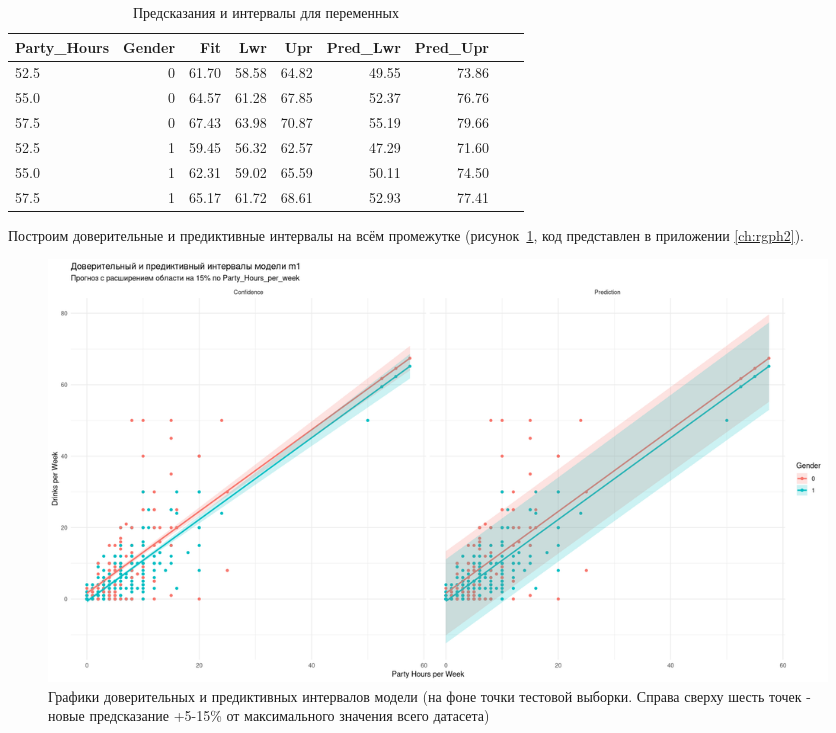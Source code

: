 

\begin{table}[ht]
	\centering
	\caption{Предсказания и интервалы для переменных}
	\begin{tabular}{|l|r|r|r|r|r|r|r|r|}
		\hline
		Party\_Hours & Gender & Fit & Lwr & Upr & Pred\_Lwr & Pred\_Upr \\
		\hline
		52.5 & 0 & 61.70 & 58.58 & 64.82 & 49.55 & 73.86 \\
		55.0 & 0 & 64.57 & 61.28 & 67.85 & 52.37 & 76.76 \\
		57.5 & 0 & 67.43 & 63.98 & 70.87 & 55.19 & 79.66 \\
		52.5 & 1 & 59.45 & 56.32 & 62.57 & 47.29 & 71.60 \\
		55.0 & 1 & 62.31 & 59.02 & 65.59 & 50.11 & 74.50 \\
		57.5 & 1 & 65.17 & 61.72 & 68.61 & 52.93 & 77.41 \\
		\hline
	\end{tabular}
	\label{tab:pred_intervals}
\end{table}

Построим доверительные и предиктивные интервалы\cite{wapnick2009} на всём промежутке (рисунок~\ref{fig:intervals}, код представлен в приложении \ref{ch:rgph2}).

\begin{figure}[h]
	\centering
	\includegraphics[height=0.6\textwidth]{imgs/intervals.png}
	\caption{Графики доверительных и предиктивных интервалов модели (на фоне точки тестовой выборки. Справа сверху шесть точек - новые предсказание +5-15\% от максимального значения всего датасета)}
	\label{fig:intervals}
\end{figure}

